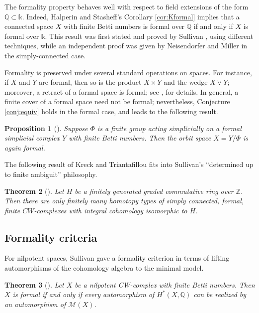 \documentclass{article}
\numberwithin{equation}{section}
\newtheorem{theorem}{Theorem}[section]
\newtheorem{proposition}[theorem]{Proposition}
\theoremstyle{definition}
\newcommand{\Z}{\mathbb{Z}}
\newcommand{\Q}{\mathbb{Q}}
\renewcommand{\k}{\mathbb{k}}
\newcommand{\M}{\mathcal{M}}
\begin{document}
The formality property behaves well with respect to field extensions of 
the form $\Q\subset \k$.  Indeed, Halperin and Stasheff's 
Corollary \ref{cor:Kformal} implies that a connected space $X$ with finite Betti 
numbers is formal over $\Q$ if and only if $X$ is formal over $\k$.  
This result was first stated and proved by Sullivan \cite{Sullivan77}, 
using different techniques, while an independent proof was 
given by Neisendorfer and Miller \cite{NM78} in the simply-connected case.

Formality is preserved under several standard operations on spaces. 
For instance, if $X$ and $Y$ are formal, then so is the product 
$X\times Y$ and the wedge $X\vee Y$; moreover, a retract of 
a formal space is formal; see \cite{FHT}, \cite{FOT} for details. 
In general, a finite cover of a formal space need not be formal;  
nevertheless, Conjecture \ref{conj:equiv} holds in the formal case, and  
leads to the following result. 

\begin{proposition}[\cite{PS-jlms}]
\label{prop:equivformal}
Suppose $\Phi$ is a finite group acting simplicially on a formal 
simplicial complex $Y$ with finite Betti numbers.  Then 
the orbit space $X=Y/\Phi$ is again formal.
\end{proposition}

The following result of Kreck and Triantafillou \cite{KT} fits into Sullivan's 
``determined up to finite ambiguit'' philosophy.

\begin{theorem}[\cite{KT}]
Let $H$ be a finitely generated graded commutative ring over $\Z$.
Then there are only finitely many homotopy types of simply 
connected, formal, finite $CW$-complexes 
with integral cohomology isomorphic to $H$.
\end{theorem}

\subsection{Formality criteria}
\label{subsec:formality-cr}

For nilpotent spaces, Sullivan gave a formality criterion in terms 
of lifting automorphisms of the cohomology algebra to the minimal model.

\begin{theorem}[\cite{Sullivan77}]
\label{thm:sullivan-formality}
Let $X$ be a nilpotent CW-complex with finite Betti numbers. Then 
$X$ is formal if and only if every automorphism of $H^*(X,\Q)$ can 
be realized by an automorphism of $\M(X)$.
\end{theorem}
\end{document}
